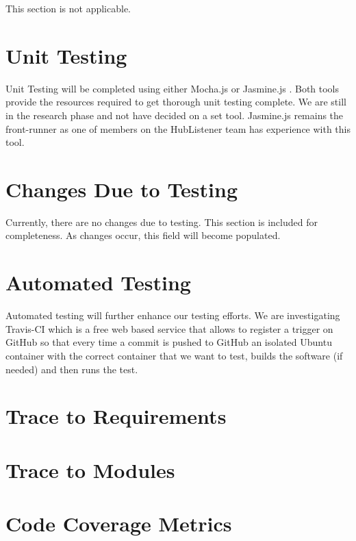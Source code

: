 \documentclass[12pt, titlepage]{article}
\begin{document}
This section is not applicable. 

\section{Unit Testing}

Unit Testing will  be completed using either Mocha.js or Jasmine.js . Both tools provide the resources required to get thorough unit testing complete. We are still in the research phase and not have decided on a set tool. Jasmine.js remains the front-runner as one of members on the HubListener team has experience with this tool. 

\section{Changes Due to Testing}

Currently, there are no changes due to testing. This section is included for completeness. As changes occur, this field will become populated. 

\section{Automated Testing}

Automated testing will further enhance our testing efforts. We are investigating Travis-CI which  is a free web based service that allows  to register a trigger on GitHub so that every time a commit is pushed to GitHub an isolated Ubuntu container with the correct container that we want to test, builds the software (if needed) and then runs the test.

		
\section{Trace to Requirements}


		
\section{Trace to Modules}		

\section{Code Coverage Metrics}




\end{document}
